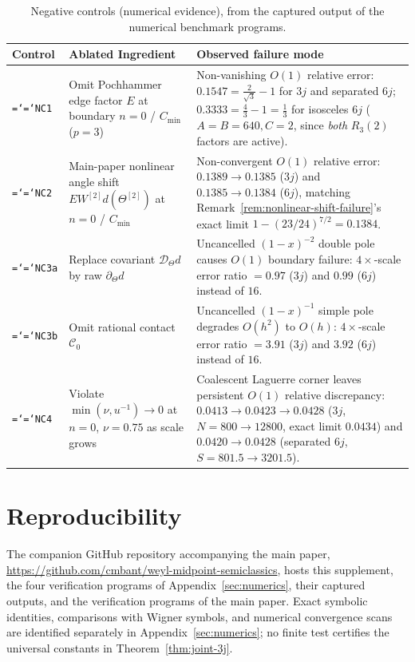 \documentclass[11pt]{article}
\theoremstyle{definition}
\theoremstyle{remark}
\newcommand{\cD}{\mathcal{D}}
\newcommand{\cC}{\mathcal{C}}
\renewcommand{\_}{\oldunderscore\penalty0\hskip0pt\relax}
\let\oldtexttt\texttt
\renewcommand{\texttt}[1]{\oldtexttt{\hyphenchar\font=`\-\relax #1}}
\begin{document}
\begin{table}[htbp]
\centering
\small
\renewcommand{\arraystretch}{1.18}
\begin{tabular}{@{}p{}p{}p{}@{}}
\toprule
\textbf{Control} & \textbf{Ablated Ingredient} & \textbf{Observed failure mode} \\
\midrule
\texttt{NC1} & Omit Pochhammer edge factor $E$ at boundary $n=0$ / $C_{\min}$ ($p=3$) & Non-vanishing $O(1)$ relative error:
  $0.1547=\frac{2}{\sqrt{3}}-1$ for $3j$ and separated $6j$; $0.3333=\frac{4}{3}-1=\frac13$ for isosceles $6j$ ($A=B=640,C=2$,
  since \emph{both} $R_3(2)$ factors are active). \\
\texttt{NC2} & Main-paper nonlinear angle shift $E W^{[2]}d(\Theta^{[2]})$ at $n=0$ / $C_{\min}$ & Non-convergent $O(1)$ relative
  error: $0.1389\to 0.1385$ ($3j$) and $0.1385\to 0.1384$ ($6j$), matching Remark~\ref{rem:nonlinear-shift-failure}'s exact limit
  $1-(23/24)^{7/2}=0.1384$. \\
\texttt{NC3a} & Replace covariant $\cD_\Theta d$ by raw $\partial_\Theta d$ & Uncancelled $(1-x)^{-2}$ double pole causes $O(1)$
  boundary failure: $4\times$-scale error ratio $=0.97$ ($3j$) and $0.99$ ($6j$) instead of $16$. \\
\texttt{NC3b} & Omit rational contact $\cC_0$ & Uncancelled $(1-x)^{-1}$ simple pole degrades $O(h^2)$ to $O(h)$: $4\times$-scale
  error ratio $=3.91$ ($3j$) and $3.92$ ($6j$) instead of $16$. \\
\texttt{NC4} & Violate $\min(\nu,u^{-1})\to 0$ at $n=0$, $\nu=0.75$ as scale grows & Coalescent Laguerre corner leaves persistent
  $O(1)$ relative discrepancy: $0.0413\to 0.0423\to 0.0428$ ($3j$, $N=800\to 12800$, exact limit $0.0434$) and $0.0420\to 0.0428$
  (separated $6j$, $S=801.5\to 3201.5$). \\
\bottomrule
\end{tabular}
\caption{Negative controls (numerical evidence), from the captured output of the numerical benchmark programs.}
\label{tab:negative-controls}
\end{table}

\section*{Reproducibility}
The companion GitHub repository accompanying the main paper, \url{https://github.com/cmbant/weyl-midpoint-semiclassics}, hosts this supplement, the four verification programs of Appendix~\ref{sec:numerics},
  their captured outputs, and the verification programs of the main paper.
  Exact symbolic identities, comparisons with Wigner symbols, and numerical convergence scans are identified separately in
  Appendix~\ref{sec:numerics}; no finite test certifies the universal constants in Theorem~\ref{thm:joint-3j}.
\end{document}
